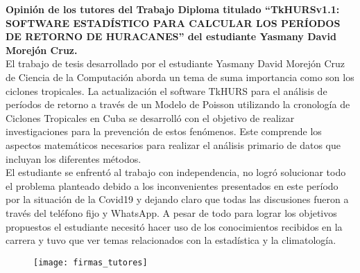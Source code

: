 \begin{opinion}
\textbf{Opinión de los tutores del Trabajo Diploma titulado “TkHURSv1.1: SOFTWARE ESTADÍSTICO PARA CALCULAR LOS PERÍODOS DE RETORNO DE HURACANES” del estudiante Yasmany David Morejón Cruz.}\\


El trabajo de tesis desarrollado por el estudiante Yasmany David Morejón Cruz de Ciencia de la Computación aborda un tema de suma importancia como son los ciclones tropicales. La actualización el software TkHURS para el análisis de períodos de retorno a través de un Modelo de Poisson utilizando la cronología de Ciclones Tropicales en Cuba se desarrolló con el objetivo de realizar investigaciones para la prevención de estos fenómenos. Este comprende los aspectos matemáticos necesarios para realizar el análisis primario de datos que incluyan los diferentes métodos.\\


El estudiante se enfrentó al trabajo con independencia, no logró solucionar todo el problema planteado debido a los inconvenientes presentados en este período por la situación de la Covid19 y dejando claro que todas las discusiones fueron a través del teléfono fijo y WhatsApp. A pesar de todo para lograr los objetivos propuestos el estudiante necesitó hacer uso de los conocimientos recibidos en la carrera y tuvo que ver temas relacionados con la estadística y la climatología.

\begin{figure}[H]
\centering
\texttt{[image: firmas\_tutores]}
\end{figure}


\end{opinion}